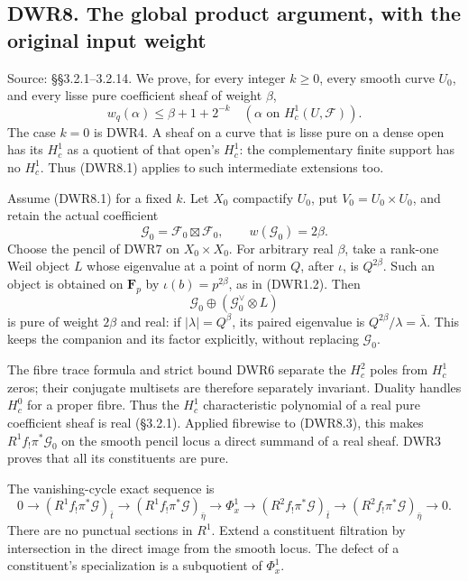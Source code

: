 \subsection{DWR8. The global product argument, with the original input
weight}\label{dwr8.-the-global-product-argument-with-the-original-input-weight}

Source: §§3.2.1--3.2.14. We prove, for every integer \(k\ge0\), every
smooth curve \(U_0\), and every lisse pure coefficient sheaf of weight
\(\beta\), \[
w_q(\alpha)\le\beta+1+2^{-k}
\quad(\alpha\text{ on }H_c^1(U,\mathcal F)).
\tag{DWR8.1}
\] The case \(k=0\) is DWR4. A sheaf on a curve that is lisse pure on a
dense open has its \(H_c^1\) as a quotient of that open's \(H_c^1\): the
complementary finite support has no \(H_c^1\). Thus (DWR8.1) applies to
such intermediate extensions too.

Assume (DWR8.1) for a fixed \(k\). Let \(X_0\) compactify \(U_0\), put
\(V_0=U_0\times U_0\), and retain the actual coefficient \[
\mathcal G_0=\mathcal F_0\boxtimes\mathcal F_0,
\qquad w(\mathcal G_0)=2\beta.
\tag{DWR8.2}
\] Choose the pencil of DWR7 on \(X_0\times X_0\). For arbitrary real
\(\beta\), take a rank-one Weil object \(L\) whose eigenvalue at a point
of norm \(Q\), after \(\iota\), is \(Q^{2\beta}\). Such an object is
obtained on \(\mathbf F_p\) by \(\iota(b)=p^{2\beta}\), as in (DWR1.2).
Then \[
\mathcal G_0\oplus(\mathcal G_0^\vee\otimes L)
\tag{DWR8.3}
\] is pure of weight \(2\beta\) and real: if \(|\lambda|=Q^\beta\), its
paired eigenvalue is \(Q^{2\beta}/\lambda=\bar\lambda\). This keeps the
companion and its factor explicitly, without replacing \(\mathcal G_0\).

The fibre trace formula and strict bound DWR6 separate the \(H_c^2\)
poles from \(H_c^1\) zeros; their conjugate multisets are therefore
separately invariant. Duality handles \(H_c^0\) for a proper fibre. Thus
the \(H_c^1\) characteristic polynomial of a real pure coefficient sheaf
is real (§3.2.1). Applied fibrewise to (DWR8.3), this makes
\(R^1f_!\pi^*\mathcal G_0\) on the smooth pencil locus a direct summand
of a real sheaf. DWR3 proves that all its constituents are pure.

The vanishing-cycle exact sequence is \[
0\to(R^1f_!\pi^*\mathcal G)_{\bar t}
\to(R^1f_!\pi^*\mathcal G)_{\bar\eta}
\to\Phi_x^1
\to(R^2f_!\pi^*\mathcal G)_{\bar t}
\to(R^2f_!\pi^*\mathcal G)_{\bar\eta}\to0.
\tag{DWR8.4}
\] There are no punctual sections in \(R^1\). Extend a constituent
filtration by intersection in the direct image from the smooth locus.
The defect of a constituent's specialization is a subquotient of
\(\Phi_x^1\).

